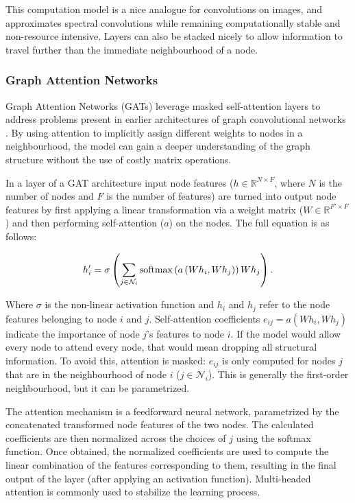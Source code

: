 	This computation model is a nice analogue for convolutions on images, and approximates spectral convolutions while remaining computationally stable and non-resource intensive. Layers can also be stacked nicely to allow information to travel further than the immediate neighbourhood of a node.
	
	\subsubsection{Graph Attention Networks}
	
	Graph Attention Networks (GATs) leverage masked self-attention layers to address problems present in earlier architectures of graph convolutional networks \cite{gat_paper}. By using attention to implicitly assign different weights to nodes in a neighbourhood, the model can gain a deeper understanding of the graph structure without the use of costly matrix operations.
	
	In a layer of a GAT architecture input node features ($h \in \mathbb{R}^{N\times F}$, where $N$ is the number of nodes and $F$ is the number of features) are turned into output node features by first applying a linear transformation via a weight matrix ($W \in \mathbb{R}^{F'\times F} $) and then performing self-attention ($a$) on the nodes. The full equation is as follows:
	
	$$ h'_i = \sigma \left(\sum_{j \in \mathcal{N}_i} \textnormal{softmax}\left(a\left(Wh_i, Wh_j\right)\right)Wh_j\right). $$
	
	Where $\sigma$ is the non-linear activation function and $h_i$ and $h_j$ refer to the node features belonging to node $i$ and $j$. Self-attention coefficients $ e_{ij} = a(W h_i, W h_j) $ indicate the importance of node $j$'s features to node $i$. If the model would allow every node to attend every node, that would mean dropping all structural information. To avoid this, attention is masked: $e_{ij}$ is only computed for nodes $j$ that are in the neighbourhood of node $i$ ($j \in \mathcal{N}_i$). This is generally the first-order neighbourhood, but it can be parametrized.
	
	The attention mechanism is a feedforward neural network, parametrized by the concatenated transformed node features of the two nodes. The calculated coefficients are then normalized across the choices of $j$ using the softmax function. Once obtained, the normalized coefficients are used to compute the linear combination of the features corresponding to them, resulting in the final output of the layer (after applying an activation function). Multi-headed attention is commonly used to stabilize the learning process.
	
